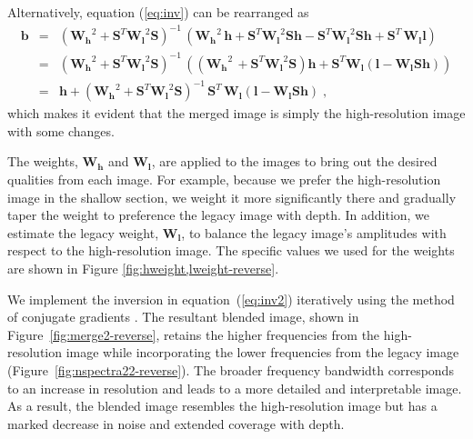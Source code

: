     Alternatively, equation (\ref{eq:inv}) can be rearranged as
    \begin{eqnarray}
        \nonumber
        \mathbf{b} & = & \left(\mathbf{W_h}^2 + \mathbf{S}^T\mathbf{W_l}^2\mathbf{S}\right)^{-1}\,\left(\mathbf{W_h}^2\,\mathbf{h}+\mathbf{S}^T\mathbf{W_l}^2\mathbf{S}\mathbf{h}-\mathbf{S}^T\mathbf{W_l}^2\mathbf{S}\mathbf{h}+\mathbf{S}^T\,\mathbf{W_l}\mathbf{l}\right) \\
    \nonumber
        & = & \left(\mathbf{W_h}^2 + \mathbf{S}^T\mathbf{W_l}^2\mathbf{S}\right)^{-1}\,\left(\left(\mathbf{W_h}^2\,+\mathbf{S}^T\mathbf{W_l}^2\mathbf{S}\right)\mathbf{h} + \mathbf{S}^T\mathbf{W_l}\left(\mathbf{l}-\mathbf{W_l}\mathbf{S}\mathbf{h}\right)\right) \\
        & = & \mathbf{h} +  \left(\mathbf{W_h}^2 + \mathbf{S}^T\mathbf{W_l}^2\mathbf{S}\right)^{-1}\,
        \mathbf{S}^T\,\mathbf{W_l}\left(\mathbf{l - W_l S h}\right)\;,
        \label{eq:inv2}
    \end{eqnarray}
    which makes it evident that the merged image is simply the high-resolution image with some changes.
    
    The weights, $\mathbf{W_h}$ and $\mathbf{W_l}$, are applied to the images to bring out the desired qualities from each image. 
    For example, because we prefer the high-resolution image in the shallow section, we weight it more significantly there and gradually taper the weight to preference the legacy image with depth. 
    In addition, we estimate the legacy weight, $\mathbf{W_l}$, to balance the legacy image's amplitudes with respect to the high-resolution image. 
    The specific values we used for the weights are shown in Figure \ref{fig:hweight,lweight-reverse}.
    
    
    
    We implement the inversion in equation~(\ref{eq:inv2}) iteratively using the method of conjugate gradients \cite[]{conjgrad}. 
    The resultant blended image, shown in Figure~\ref{fig:merge2-reverse}, retains the higher frequencies from the high-resolution image while incorporating the lower frequencies from the legacy image (Figure~\ref{fig:nspectra22-reverse}). 
    The broader frequency bandwidth corresponds to an increase in resolution and leads to a more detailed and interpretable image.  
    As a result, the blended image resembles the high-resolution image but has a marked decrease in noise and extended coverage with depth. 
    
